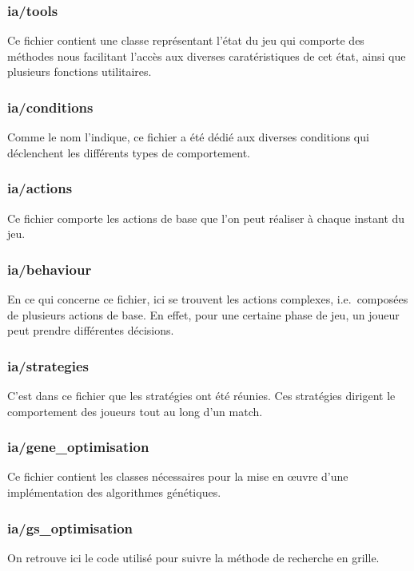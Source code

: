 \documentclass[12pt,a4paper]{article}
\begin{document}
\subsubsection*{ia/tools}
Ce fichier contient une classe repr\'esentant l'\'etat du jeu qui comporte des 
m\'ethodes nous facilitant l'acc\`es aux diverses carat\'eristiques de cet 
\'etat, ainsi que plusieurs fonctions utilitaires.

\subsubsection*{ia/conditions}
Comme le nom l'indique, ce fichier a \'et\'e d\'edi\'e aux diverses conditions 
qui d\'eclenchent les diff\'erents types de comportement.

\subsubsection*{ia/actions}
Ce fichier comporte les actions de base que l'on peut r\'ealiser \`a chaque 
instant du jeu.

\subsubsection*{ia/behaviour}
En ce qui concerne ce fichier, ici se trouvent les actions complexes, i.e.\ 
compos\'ees de plusieurs actions de base. En effet, pour une certaine phase de 
jeu, un joueur peut prendre diff\'erentes d\'ecisions.

\subsubsection*{ia/strategies}
C'est dans ce fichier que les strat\'egies ont \'et\'e r\'eunies. Ces 
strat\'egies dirigent le comportement des joueurs tout au long d'un 
match.

\subsubsection*{ia/gene\_optimisation}
Ce fichier contient les classes n\'ecessaires pour la mise en \oe uvre d'une 
impl\'ementation des algorithmes g\'en\'etiques.

\subsubsection*{ia/gs\_optimisation}
On retrouve ici le code utilis\'e pour suivre la m\'ethode de recherche en 
grille.
\end{document}
